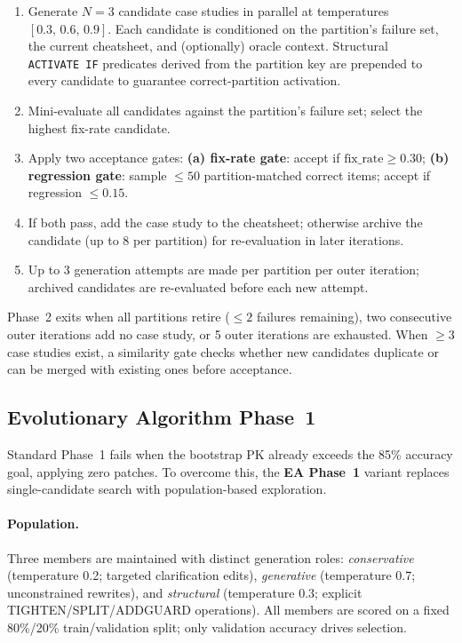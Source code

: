 \documentclass{article}
\begin{document}
\begin{enumerate}[noitemsep,topsep=2pt]
  \item Generate $N=3$ candidate case studies in parallel at temperatures
        $[0.3,\,0.6,\,0.9]$.
        Each candidate is conditioned on the partition's failure set, the current cheatsheet,
        and (optionally) oracle context.
        Structural \texttt{ACTIVATE~IF} predicates derived from the partition key are
        prepended to every candidate to guarantee correct-partition activation.
  \item Mini-evaluate all candidates against the partition's failure set; select the
        highest fix-rate candidate.
  \item Apply two acceptance gates:
        \textbf{(a) fix-rate gate}: accept if $\text{fix\_rate} \geq 0.30$;
        \textbf{(b) regression gate}: sample $\leq 50$ partition-matched correct items;
        accept if regression $\leq 0.15$.
  \item If both pass, add the case study to the cheatsheet; otherwise archive the candidate
        (up to 8 per partition) for re-evaluation in later iterations.
  \item Up to 3 generation attempts are made per partition per outer iteration;
        archived candidates are re-evaluated before each new attempt.
\end{enumerate}

Phase~2 exits when all partitions retire ($\leq 2$ failures remaining), two consecutive outer
iterations add no case study, or 5 outer iterations are exhausted.
When $\geq 3$ case studies exist, a similarity gate checks whether new candidates duplicate
or can be merged with existing ones before acceptance.

\subsection{Evolutionary Algorithm Phase~1}
\label{sec:ea_method}

Standard Phase~1 fails when the bootstrap PK already exceeds the 85\% accuracy goal,
applying zero patches.
To overcome this, the \textbf{EA Phase~1} variant replaces single-candidate search with
population-based exploration.

\paragraph{Population.}
Three members are maintained with distinct generation roles:
\emph{conservative} (temperature 0.2; targeted clarification edits),
\emph{generative} (temperature 0.7; unconstrained rewrites),
and \emph{structural} (temperature 0.3; explicit TIGHTEN/SPLIT/ADD\textunderscore GUARD
operations).
All members are scored on a fixed 80\%/20\% train/validation split;
only validation accuracy drives selection.
\end{document}
